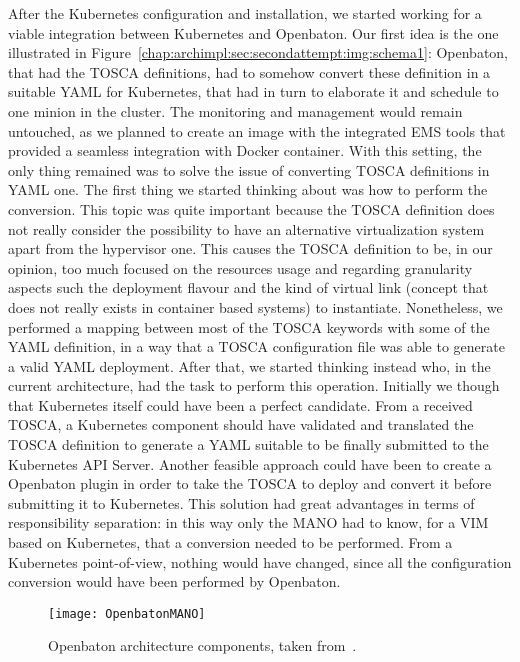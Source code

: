 After the Kubernetes configuration and installation, we started working for a
viable integration between Kubernetes and Openbaton. Our first idea is the one
illustrated in Figure~\ref{chap:archimpl:sec:secondattempt:img:schema1}:
Openbaton, that had the TOSCA definitions, had to somehow convert these
definition in a suitable YAML for Kubernetes, that had in turn to elaborate it
and schedule to one minion in the cluster. The monitoring and management would
remain untouched, as we planned to create an image with the integrated EMS tools
that provided a seamless integration with Docker container. With this setting,
the only thing remained was to solve the issue of converting TOSCA definitions
in YAML one. The first thing we started thinking about was how to perform the
conversion. This topic was quite important because the TOSCA definition does not
really consider the possibility to have an alternative virtualization system
apart from the hypervisor one. This causes the TOSCA definition to be, in our
opinion, too much focused on the resources usage and regarding granularity
aspects such the deployment flavour and the kind of virtual link (concept that
does not really exists in container based systems) to instantiate. Nonetheless,
we performed a mapping between most of the TOSCA keywords with some of the YAML
definition, in a way that a TOSCA configuration file was able to generate a
valid YAML deployment. After that, we started thinking instead who, in the
current architecture, had the task to perform this operation. Initially we
though that Kubernetes itself could have been a perfect candidate. From a
received TOSCA, a Kubernetes component should have validated and translated the
TOSCA definition to generate a YAML suitable to be finally submitted to the
Kubernetes API Server. Another feasible approach could have been to create a
Openbaton plugin in order to take the TOSCA to deploy and convert it before
submitting it to Kubernetes. This solution had great advantages in terms of
responsibility separation: in this way only the MANO had to know, for a VIM
based on Kubernetes, that a conversion needed to be performed. From a Kubernetes
point-of-view, nothing would have changed, since all the configuration
conversion would have been performed by Openbaton.

\begin{figure}[t]
  \centering
  \texttt{[image: OpenbatonMANO]}
  \caption[Openbaton architecture components]{Openbaton architecture components,
    taken from~\cite{openbatondocumentation}.}
  \label{chap:archimpl:sec:secondattempt:img:openbatonMANO}
\end{figure}

